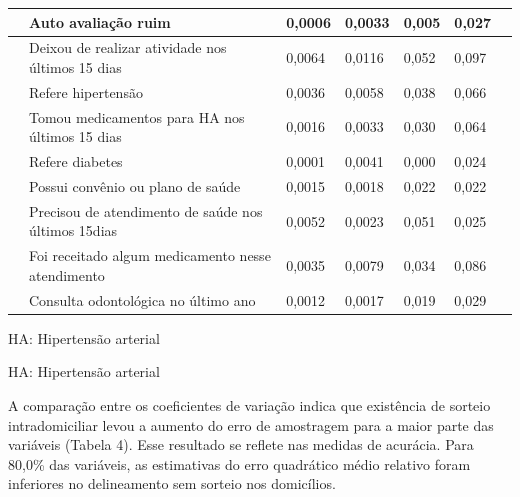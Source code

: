 \documentclass{article}
\begin{document}
\begin{table}
\begin{xtabular}{ l | l | l l | l | l | l }
& Auto avaliação ruim
& 0,0006
& 0,0033
& 0,005
& 0,027
\\ \hline

& Deixou de realizar atividade nos últimos 15 dias
& 0,0064
& 0,0116
& 0,052
& 0,097
\\ \hline

& Refere hipertensão
& 0,0036
& 0,0058
& 0,038
& 0,066
\\ \hline

& Tomou medicamentos para HA nos últimos 15 dias
& 0,0016
& 0,0033
& 0,030
& 0,064
\\ \hline

& Refere diabetes
& 0,0001
& 0,0041
& 0,000
& 0,024
\\ \hline

& Possui convênio ou plano de saúde
& 0,0015
& 0,0018
& 0,022
& 0,022
\\ \hline

& Precisou de atendimento de saúde nos últimos 15dias
& 0,0052
& 0,0023
& 0,051
& 0,025
\\ \hline

& Foi receitado algum medicamento nesse atendimento
& 0,0035
& 0,0079
& 0,034
& 0,086
\\ \hline

& Consulta odontológica no último ano
& 0,0012
& 0,0017
& 0,019
& 0,029
\\ \hline

\end{xtabular}
\end{table}

HA: Hipertensão arterial

HA: Hipertensão arterial

A comparação entre os coeficientes de variação indica que existência de sorteio
intradomiciliar levou a aumento do erro de amostragem para a maior parte das
variáveis (Tabela 4). Esse resultado se reflete nas medidas de acurácia. Para
80,0\% das variáveis, as estimativas do erro quadrático médio relativo foram
inferiores no delineamento sem sorteio nos domicílios.
\end{document}
